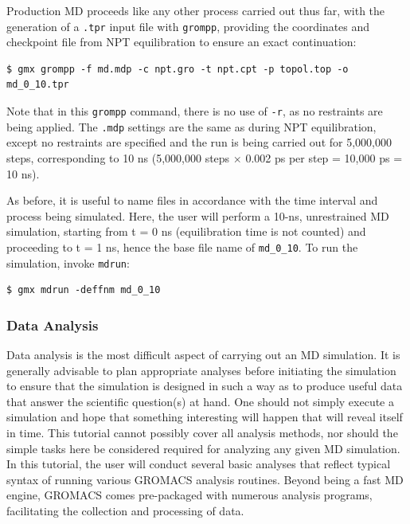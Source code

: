 \documentclass[9pt,tutorial,pubversion]{livecoms}
\begin{document}
Production MD proceeds like any other process carried out thus far, with the generation of a \texttt{.tpr} input file with \texttt{grompp}, providing the coordinates and checkpoint file from NPT equilibration to ensure an exact continuation:

\begin{lstlisting}
$ gmx grompp -f md.mdp -c npt.gro -t npt.cpt -p topol.top -o md_0_10.tpr
\end{lstlisting}
%
Note that in this \texttt{grompp} command, there is no use of \texttt{-r}, as no restraints are being applied. The \texttt{.mdp} settings are the same as during NPT equilibration, except no restraints are specified and the run is being carried out for 5,000,000 steps, corresponding to 10 ns (5,000,000 steps $\times$ 0.002 ps per step = 10,000 ps = 10 ns).

As before, it is useful to name files in accordance with the time interval and process being simulated. Here, the user will perform a 10-ns, unrestrained MD simulation, starting from t = 0 ns (equilibration time is not counted) and proceeding to t = 1 ns, hence the base file name of \texttt{md\_0\_10}. To run the simulation, invoke \texttt{mdrun}:

\begin{lstlisting}
$ gmx mdrun -deffnm md_0_10
\end{lstlisting}

\subsubsection{Data Analysis} \label{lyso_ana}

Data analysis is the most difficult aspect of carrying out an MD simulation. It is generally advisable to plan appropriate analyses before initiating the simulation to ensure that the simulation is designed in such a way as to produce useful data that answer the scientific question(s) at hand. One should not simply execute a simulation and hope that something interesting will happen that will reveal itself in time. This tutorial cannot possibly cover all analysis methods, nor should the simple tasks here be considered required for analyzing any given MD simulation. In this tutorial, the user will conduct several basic analyses that reflect typical syntax of running various GROMACS analysis routines. Beyond being a fast MD engine, GROMACS comes pre-packaged with numerous analysis programs, facilitating the collection and processing of data.
\end{document}

